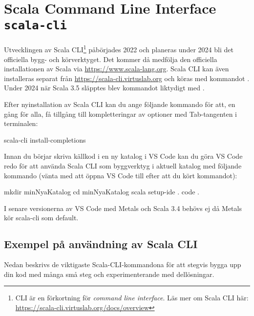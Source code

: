 \section{Scala Command Line Interface \texttt{scala-cli}}\label{appendix:build:scala-cli}

Utvecklingen av Scala CLI\footnote{CLI är en förkortning för \textit{command line interface}. Läs mer om Scala CLI här: \url{https://scala-cli.virtuslab.org/docs/overview}} påbörjades 2022 och planeras under 2024 bli det officiella bygg- och körverktyget. Det kommer då medfölja den officiella installationen av Scala via \url{https://www.scala-lang.org}. Scala CLI kan även installeras separat från \url{https://scala-cli.virtuslab.org} och köras med kommandot . Under 2024 när Scala 3.5 släpptes blev kommandot  liktydigt med .

Efter nyinstallation av Scala CLI kan du ange följande kommando för att, en gång för alla, få tillgång till kompletteringar av optioner med Tab-tangenten i terminalen:
\begin{REPLsmall}
scala-cli install-completions 
\end{REPLsmall}

Innan du börjar skriva källkod i en ny katalog i VS Code kan du göra VS Code redo för att använda Scala CLI som byggverktyg i aktuell katalog med följande kommando (vänta med att öppna VS Code till efter att du kört kommandot): 
\begin{REPLsmall}
mkdir minNyaKatalog
cd minNyaKatalog
scala setup-ide . 
code .
\end{REPLsmall}
I senare versionerna av VS Code med Metals och Scala 3.4 behövs ej  då Metals kör scala-cli som default.

\subsection{Exempel på användning av Scala CLI}\label{appendix:build-scala-cli-watch-mode}

Nedan beskrivs de viktigaste Scala-CLI-kommandona för att stegvis bygga upp din kod med många små steg och experimenterande med dellösningar. 

